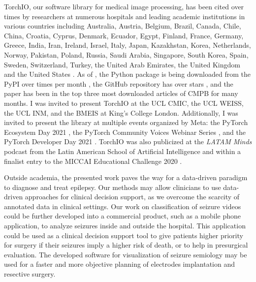 TorchIO, our software library for medical image processing,
has been cited over \torchiocitations times by researchers
at numerous hospitals and leading academic institutions in various countries including
Australia, Austria, Belgium, Brazil, Canada, Chile, China, Croatia, Cyprus, Denmark, Ecuador, Egypt, Finland, France, Germany, Greece, India, Iran, Ireland, Israel, Italy, Japan, Kazakhstan, Korea, Netherlands, Norway, Pakistan, Poland, Russia, Saudi Arabia, Singapore, South Korea, Spain, Sweden, Switzerland, Turkey, the United Arab Emirates, the United Kingdom and the United States%
.
As of \monthname{} \the\year, the Python package is being downloaded from the \ac{PyPI} over \torchiomonthdownloads times per month%
,
the GitHub repository has over \torchiostars stars%
,
and the paper has been in the top three most downloaded articles of \ac{CMPB}%
for many months.
I was invited to present TorchIO at
the UCL \ac{CMIC},
the UCL \ac{WEISS},
the UCL \ac{INM}, and
the \ac{BMEIS} at King's College London.
Additionally, I was invited to present the library at multiple events organized by Meta: the PyTorch Ecosystem Day 2021%
,
the PyTorch Community Voices Webinar Series%
,
and the PyTorch Developer Day 2021%
.
TorchIO was also publicized at the \textit{LATAM Minds} podcast from the Latin American School of Artificial Intelligence%
and within a finalist entry to the MICCAI Educational Challenge 2020%
.

Outside academia, the presented work paves the way for a data-driven paradigm to diagnose and treat epilepsy.
Our methods may allow clinicians to use data-driven approaches for clinical decision support, as we overcome the scarcity of annotated data in clinical settings.
Our work on classification of seizure videos could be further developed into a commercial product, such as a mobile phone application, to analyze seizures inside and outside the hospital.
This application could be used as a clinical decision support tool to give patients higher priority for surgery if their seizures imply a higher risk of death, or to help in presurgical evaluation.
The developed software for visualization of seizure semiology may be used for a faster and more objective planning of electrodes implantation and resective surgery.


